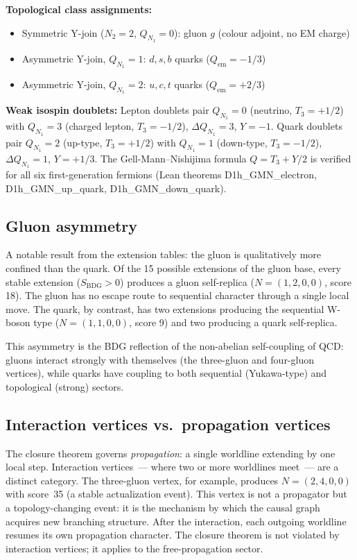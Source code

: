 \documentclass[11pt,a4paper]{article}
\newcommand{\SBDG}{S_{\mathrm{BDG}}}
\begin{document}
\noindent\textbf{Topological class assignments:}
\begin{itemize}[noitemsep]
  \item Symmetric Y-join ($N_2=2$, $Q_{N_1}=0$): gluon $g$
    (colour adjoint, no EM charge)
  \item Asymmetric Y-join, $Q_{N_1}=1$: $d, s, b$ quarks
    ($Q_\mathrm{em} = -1/3$)
  \item Asymmetric Y-join, $Q_{N_1}=2$: $u, c, t$ quarks
    ($Q_\mathrm{em} = +2/3$)
\end{itemize}

\noindent\textbf{Weak isospin doublets:}
Lepton doublets pair $Q_{N_1}=0$ (neutrino, $T_3=+1/2$) with
$Q_{N_1}=3$ (charged lepton, $T_3=-1/2$), $\Delta Q_{N_1}=3$,
$Y=-1$. Quark doublets pair $Q_{N_1}=2$ (up-type, $T_3=+1/2$)
with $Q_{N_1}=1$ (down-type, $T_3=-1/2$), $\Delta Q_{N_1}=1$,
$Y=+1/3$. The Gell-Mann--Nishijima formula $Q=T_3+Y/2$ is verified
for all six first-generation fermions (Lean theorems D1h\_GMN\_electron,
D1h\_GMN\_up\_quark, D1h\_GMN\_down\_quark).

\subsection{Gluon asymmetry}

A notable result from the extension tables: the gluon is qualitatively
more confined than the quark. Of the 15 possible extensions of the
gluon base, every stable extension ($\SBDG > 0$) produces a gluon
self-replica ($N=(1,2,0,0)$, score 18). The gluon has no escape route
to sequential character through a single local move. The quark, by
contrast, has two extensions producing the sequential W-boson type
($N=(1,1,0,0)$, score 9) and two producing a quark self-replica.

This asymmetry is the BDG reflection of the non-abelian self-coupling
of QCD: gluons interact strongly with themselves (the three-gluon and
four-gluon vertices), while quarks have coupling to both sequential
(Yukawa-type) and topological (strong) sectors.

\subsection{Interaction vertices vs.\ propagation vertices}

The closure theorem governs \emph{propagation}: a single worldline
extending by one local step. Interaction vertices~--- where two or more
worldlines meet~--- are a distinct category. The three-gluon vertex,
for example, produces $N=(2,4,0,0)$ with score~35 (a stable
actualization event). This vertex is not a propagator but a topology-changing
event: it is the mechanism by which the causal graph acquires new
branching structure. After the interaction, each outgoing worldline
resumes its own propagation character. The closure theorem is not
violated by interaction vertices; it applies to the free-propagation
sector.
\end{document}
